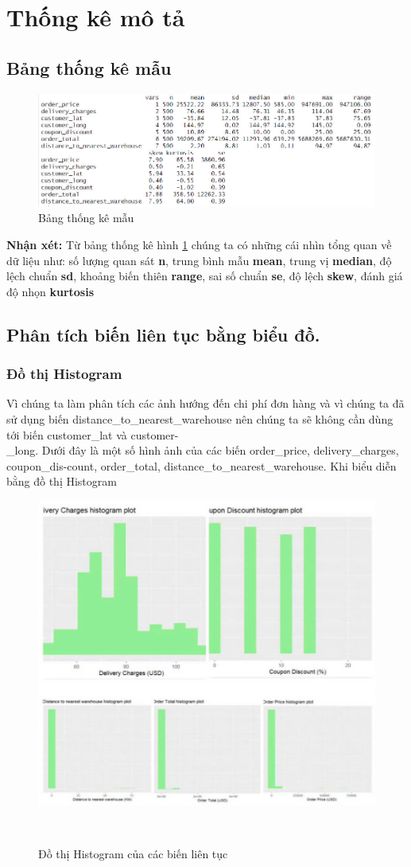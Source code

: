 \section{Thống kê mô tả}

\subsection{Bảng thống kê mẫu}
\begin{figure}[H]
    \centering
    \includegraphics[width=0.8\linewidth]{graphics/bảng thống kê mẫu.jpg}
    \caption{Bảng thống kê mẫu}
    \label{34}
\end{figure}
\textbf{Nhận xét:} Từ bảng thống kê hình \ref{34} 
chúng ta có những cái nhìn tổng quan về dữ liệu như: số lượng quan sát \textbf{n}, trung bình mẫu \textbf{mean}, trung vị \textbf{median}, độ lệch chuẩn \textbf{sd}, khoảng biến thiên \textbf{range}, sai số chuẩn \textbf{se}, độ lệch \textbf{skew}, đánh giá độ nhọn \textbf{kurtosis}


\subsection{Phân tích biến liên tục bằng biểu đồ.}
\subsubsection{Đồ thị Histogram}
	Vì chúng ta làm phân tích các ảnh hướng đến chi phí đơn hàng và vì chúng ta đã sử dụng biến distance\_to\_nearest\_warehouse nên chúng ta sẽ không cần dùng tới biến customer\_lat và customer-\\\_long. Dưới đây là một số hình ảnh của các biến order\_price, delivery\_charges, coupon\_dis-count, order\_total, distance\_to\_nearest\_warehouse. Khi biểu diễn bằng đồ thị Histogram
\begin{figure}[H]
    \centering
    \includegraphics[width=0.7\linewidth]{graphics/bang7.jpg}
    \caption{Đồ thị Histogram của các biến liên tục}\
    \label{asb}
\end{figure}
\FloatBarrier

